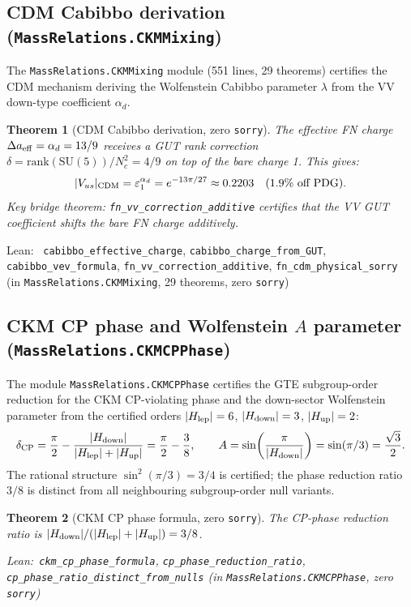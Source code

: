 \documentclass[11pt,a4paper]{article}
\newenvironment{leanref}%
  {\par\smallskip\noindent\begingroup\raggedright\textup{Lean:}~}%
  {\par\endgroup}
\newtheorem{theorem}{Theorem}[section]
\theoremstyle{definition}
\begin{document}
\subsection{CDM Cabibbo derivation (\texttt{MassRelations.CKMMixing})}\label{subsec:ckm-mixing}

The \texttt{MassRelations.CKMMixing} module (551 lines, 29 theorems) certifies the
CDM mechanism deriving the Wolfenstein Cabibbo parameter $\lambda$ from the
VV down-type coefficient $\alpha_d$.

\begin{theorem}[CDM Cabibbo derivation, zero \texttt{sorry}]
The effective FN charge $\Delta a_{\rm eff} = \alpha_d = 13/9$ receives a GUT
rank correction $\delta = \mathrm{rank}(\mathrm{SU}(5))/N_c^2 = 4/9$ on top of
the bare charge 1.  This gives:
\[
|V_{us}|_{\rm CDM} = \varepsilon_1^{\alpha_d} = e^{-13\pi/27} \approx 0.2203
\quad (1.9\%\ \text{off PDG}).
\]
Key bridge theorem: \lstinline|fn_vv_correction_additive| certifies that the VV GUT
coefficient shifts the bare FN charge additively.
\end{theorem}

\begin{leanref}
\lstinline|cabibbo_effective_charge|, \lstinline|cabibbo_charge_from_GUT|,
\lstinline|cabibbo_vev_formula|, \lstinline|fn_vv_correction_additive|,
\lstinline|fn_cdm_physical_sorry|
\textup{(in \texttt{MassRelations.CKMMixing}, 29 theorems, zero \texttt{sorry})}
\end{leanref}

\subsection{CKM CP phase and Wolfenstein \texorpdfstring{$A$}{A} parameter (\texttt{MassRelations.CKMCPPhase})}\label{subsec:ckm-cp-phase}

The module \texttt{MassRelations.CKMCPPhase} certifies the GTE subgroup-order
reduction for the CKM CP-violating phase and the down-sector Wolfenstein parameter
from the certified orders $|H_{\rm lep}|=6$, $|H_{\rm down}|=3$, $|H_{\rm up}|=2$:
\[
\delta_{\rm CP} = \frac{\pi}{2} - \frac{|H_{\rm down}|}{|H_{\rm lep}|+|H_{\rm up}|}
= \frac{\pi}{2} - \frac{3}{8},
\qquad
A = \sin\!\left(\frac{\pi}{|H_{\rm down}|}\right) = \sin(\pi/3) = \frac{\sqrt{3}}{2}.
\]
The rational structure $\sin^2(\pi/3)=3/4$ is certified; the phase reduction ratio
$3/8$ is distinct from all neighbouring subgroup-order null variants.

\begin{theorem}[CKM CP phase formula, zero \texttt{sorry}]\label{thm:ckm-cp-phase-formula}
The CP-phase reduction ratio is $|H_{\rm down}|/(|H_{\rm lep}|+|H_{\rm up}|)=3/8$.

\begin{leanref}\lstinline|ckm_cp_phase_formula|,
\lstinline|cp_phase_reduction_ratio|,
\lstinline|cp_phase_ratio_distinct_from_nulls|
\textup{(in \texttt{MassRelations.CKMCPPhase}, zero \texttt{sorry})}\end{leanref}
\end{theorem}
\end{document}
